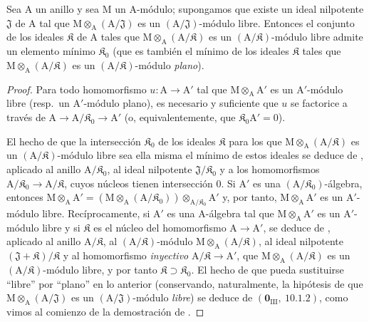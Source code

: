 \begin{corollary}[11.4.4]
\label{IV.11.4.4}
Sea $\mathrm{A}$ un anillo y sea $\mathrm{M}$ un $\mathrm{A}$-módulo; supongamos que existe
un ideal nilpotente $\mathfrak{J}$ de $\mathrm{A}$ tal que $\mathrm{M}\otimes_\mathrm{A}(\mathrm{A}/\mathfrak{J})$ es un $(\mathrm{A}/\mathfrak{J})$-módulo libre. Entonces el conjunto de los
ideales $\mathfrak{K}$ de $\mathrm{A}$ tales que $\mathrm{M}\otimes_\mathrm{A}(\mathrm{A}/\mathfrak{K})$ es un $(\mathrm{A}/\mathfrak{K})$-módulo libre admite un elemento mínimo $\mathfrak{K}_0$
(que es también el mínimo de los ideales $\mathfrak{K}$ tales que $\mathrm{M}\otimes_\mathrm{A}(\mathrm{A}/\mathfrak{K})$ es un $(\mathrm{A}/\mathfrak{K})$-módulo \emph{plano}).
\end{corollary}

\begin{proof}
Para todo homomorfismo $u:\mathrm{A}\to\mathrm{A}'$ tal que $\mathrm{M}\otimes_\mathrm{A}\mathrm{A}'$ es un $\mathrm{A}'$-módulo libre (resp.\ un
$\mathrm{A}'$-módulo plano), es necesario y suficiente que $u$ se factorice a través de $\mathrm{A}\to\mathrm{A}/\mathfrak{K}_0\to\mathrm{A}'$ (o, equivalentemente, que $\mathfrak{K}_0\mathrm{A}'=0$).

El hecho de que la intersección $\mathfrak{K}_0$ de los ideales $\mathfrak{K}$ para los que $\mathrm{M}\otimes_\mathrm{A}(\mathrm{A}/\mathfrak{K})$ es un
$(\mathrm{A}/\mathfrak{K})$-módulo libre sea ella misma el mínimo de estos ideales se deduce de , aplicado al
anillo $\mathrm{A}/\mathfrak{K}_0$, al ideal nilpotente $\mathfrak{J}/\mathfrak{K}_0$ y a los homomorfismos $\mathrm{A}/\mathfrak{K}_0\to\mathrm{A}/\mathfrak{K}$,
cuyos núcleos tienen intersección $0$. Si $\mathrm{A}'$ es una $(\mathrm{A}/\mathfrak{K}_0)$-álgebra, entonces
$\mathrm{M}\otimes_\mathrm{A}\mathrm{A}'=(\mathrm{M}\otimes_\mathrm{A}(\mathrm{A}/\mathfrak{K}_0))\otimes_{\mathrm{A}/\mathfrak{K}_0}\mathrm{A}'$ y, por tanto, $\mathrm{M}\otimes_\mathrm{A}\mathrm{A}'$ es un $\mathrm{A}'$-módulo libre. Recíprocamente, si $\mathrm{A}'$ es una $\mathrm{A}$-álgebra tal que $\mathrm{M}\otimes_\mathrm{A}\mathrm{A}'$ es un $\mathrm{A}'$-módulo libre y si $\mathfrak{K}$ es el núcleo
del homomorfismo $\mathrm{A}\to\mathrm{A}'$, se deduce de , aplicado al anillo $\mathrm{A}/\mathfrak{K}$, al
$(\mathrm{A}/\mathfrak{K})$-módulo $\mathrm{M}\otimes_\mathrm{A}(\mathrm{A}/\mathfrak{K})$, al ideal nilpotente $(\mathfrak{J}+\mathfrak{K})/\mathfrak{K}$ y al homomorfismo \emph{inyectivo}
$\mathrm{A}/\mathfrak{K}\to\mathrm{A}'$, que $\mathrm{M}\otimes_\mathrm{A}(\mathrm{A}/\mathfrak{K})$ es un $(\mathrm{A}/\mathfrak{K})$-módulo libre, y por tanto $\mathfrak{K}\supset\mathfrak{K}_0$. El hecho de que
pueda sustituirse ``libre'' por ``plano'' en lo anterior (conservando, naturalmente,
la hipótesis de que $\mathrm{M}\otimes_\mathrm{A}(\mathrm{A}/\mathfrak{J})$ es un $(\mathrm{A}/\mathfrak{J})$-módulo \emph{libre}) se deduce de $(\mathbf{0}_{\mathrm{III}},~10.1.2)$,
como vimos al comienzo de la demostración de .
\end{proof}

